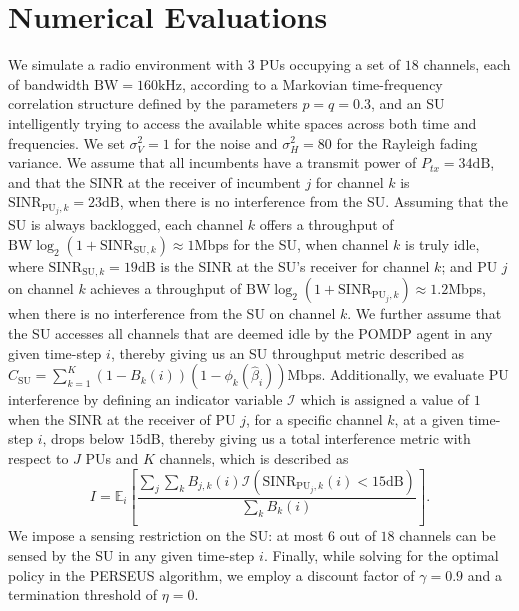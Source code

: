\documentclass[10pt,twocolumn]{IEEEtran}
\begin{document}
\section{Numerical Evaluations}\label{IV}
We simulate a radio environment with $3$ PUs occupying a set of $18$ channels, each of bandwidth $\text{BW}{=}160 \text{kHz}$, according to a Markovian time-frequency correlation structure defined by the parameters $p{=}q{=}0.3$, and an SU intelligently trying to access the available white spaces across both time and frequencies. We set $\sigma_{V}^{2}{=}1$ for the noise and $\sigma_{H}^{2}{=}80$ for the Rayleigh fading variance. We assume that all incumbents have a transmit power of $P_{tx}{=}34 \text{dB}$, and that the SINR at the receiver of incumbent $j$ for channel $k$ is $\text{SINR}_{\text{PU}_{j}, k}{=}23 \text{dB}$, when there is no interference from the SU. Assuming that the SU is always backlogged, each channel $k$ offers a throughput of $\text{BW}\log_{2}(1{+}\text{SINR}_{\text{SU}, k}){\approx}1$Mbps for the SU, when channel $k$ is truly idle, where $\text{SINR}_{\text{SU}, k}{=}19 \text{dB}$ is the SINR at the SU's receiver for channel $k$; and PU $j$ on channel $k$ achieves a throughput of $\text{BW}\log_{2}(1{+}\text{SINR}_{\text{PU}_{j}, k}){\approx}1.2$Mbps, when there is no interference from the SU on channel $k$. We further assume that the SU accesses all channels that are deemed idle by the POMDP agent in any given time-step $i$, thereby giving us an SU throughput metric described as $C_{\text{SU}}{=}\sum_{k=1}^{K}(1{-}B_{k}(i))(1{-}\phi_{k}(\hat{\beta}_{i}))$Mbps. Additionally, we evaluate PU interference by defining an indicator variable $\mathcal{I}$ which is assigned a value of $1$ when the SINR at the receiver of PU $j$, for a specific channel $k$, at a given time-step $i$, drops below $15$dB, thereby giving us a total interference metric with respect to $J$ PUs and $K$ channels, which is described as $$I{=}\mathbb{E}_{i}\left[\frac{\sum_{j}\sum_{k}B_{j,k}(i)\mathcal{I}(\text{SINR}_{\text{PU}_{j}, k}(i){<}15\text{dB})}{\sum_{k}B_{k}(i)}\right].$$
We impose a sensing restriction on the SU: at most $6$ out of $18$ channels can be sensed by the SU in any given time-step $i$. Finally, while solving for the optimal policy in the PERSEUS algorithm, we employ a discount factor of $\gamma{=}0.9$ and a termination threshold of $\eta{=}0$.
\end{document}
